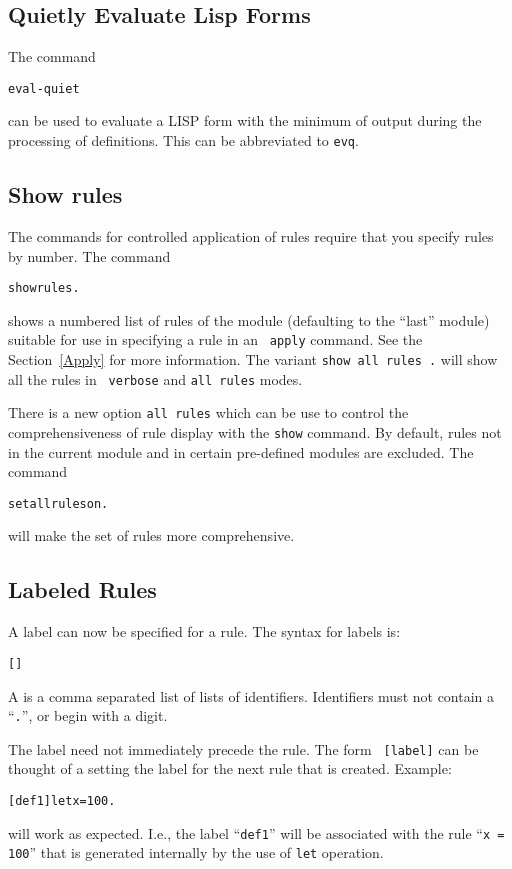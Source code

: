 \subsection{Quietly Evaluate Lisp Forms}
The command
\begin{alltt}
        eval-quiet 
\end{alltt}
can be used to evaluate a LISP form with the minimum of output during
the processing of definitions.  This can be abbreviated to {\tt evq}.

\subsection{Show rules}
The commands for controlled application of rules require that you
specify rules by number.  The command
\begin{alltt}
        show rules \lopt {} \ropt .
\end{alltt}
\noi shows a numbered list of rules of the module (defaulting to the
``last'' module) suitable for use in specifying a rule in an {\tt
  apply} command.  See the Section~\ref{Apply} for more information.
The variant {\tt show all rules .}  will show all the rules in {\tt
  verbose} and {\tt all rules} modes.

There is a new option {\tt all rules} which can be use to control the
comprehensiveness of rule display with the {\tt show} command.  By
default, rules not in the current module and in certain pre-defined
modules are excluded.  The command
\begin{alltt}
        set all rules on .
\end{alltt}
will make the set of rules more comprehensive.

\subsection{Labeled Rules}
A label can now be specified for a rule.  The syntax for labels is:
\begin{alltt}
        [  ] 
\end{alltt}
A  is a comma separated list of lists of identifiers.
Identifiers must not contain a ``{\tt .}'', or begin with a digit.  

The label need not immediately precede the rule.  The form {\tt
  [label]} can be thought of a setting the label for the next rule
that is created.  Example:
\begin{alltt}
        [def1] let x = 100 .
\end{alltt}
will work as expected. I.e., the label ``{\tt def1}'' will be
associated with the rule ``{\tt x = 100}'' that is generated
internally by the use of {\tt let} operation.


